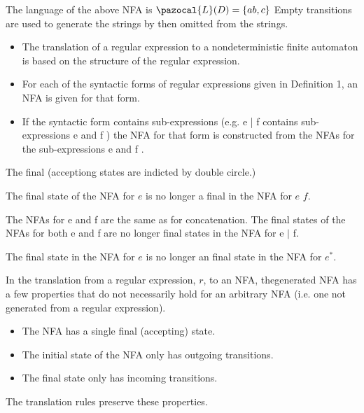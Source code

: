 The language of the above NFA is $\pazocal{L}(D) = \{ab, c\}$ Empty transitions are used to generate the strings by then omitted from the strings. 

\begin{itemize}
    \item The translation of a regular expression to a nondeterministic finite automaton is based on the structure of the regular expression.
    \item For each of the syntactic forms of regular expressions given in Definition 1, an NFA is given for that form.
    \item If the syntactic form contains sub-expressions (e.g. e | f contains sub-expressions e and f ) the NFA for that form is constructed from the NFAs for the sub-expressions e and f .
\end{itemize}

The final (acceptiong states are indicted by double circle.)

The final state of the NFA for $e$ is no longer a final in the NFA for $e$ $f$.


The NFAs for e and f are the same as for concatenation.
The final states of the NFAs for both e and f are no longer final
states in the NFA for e $|$ f.

The final state in the NFA for $e$ is no longer an final state in the NFA for $e^*$.



In the translation from a regular expression, $r$, to an NFA, thegenerated NFA has a few properties that do not necessarily hold for an arbitrary NFA (i.e. one not generated from a regular expression).
\begin{itemize}
    \item The NFA has a single final (accepting) state.
    \item The initial state of the NFA only has outgoing transitions.
    \item The final state only has incoming transitions.
\end{itemize}
The translation rules preserve these properties.

